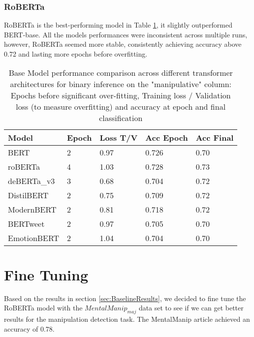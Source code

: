 \documentclass[
	letterpaper, %
	12pt, %
	unnumberedsections, %
	twoside, %
]{LTJournalArticle}
\begin{document}
\subsubsection{RoBERTa}
RoBERTa is the best-performing model in Table \ref{tab:BaseModelPerformance}, it slightly outperformed BERT-base. All the models performances were inconsistent across multiple runs, however, RoBERTa seemed more stable, consistently achieving accuracy above 0.72 and lasting more epochs before overfitting.



\begin{table}[h!]
	\small
	\begin{tabular}{|p{2.2cm}|p{0.9cm}|p{1cm}|p{1cm}|p{1cm}|}
		\hline
		\textbf{Model} & \textbf{Epoch} & \textbf{Loss T/V} & \textbf{Acc Epoch} & \textbf{Acc Final} \\
		\hline
		BERT           & 2              & 0.97              & 0.726              & 0.70               \\
		roBERTa        & 4              & 1.03              & 0.728              & 0.73               \\
		deBERTa\_v3    & 3              & 0.68              & 0.704              & 0.72               \\
		DistilBERT     & 2              & 0.75              & 0.709              & 0.72               \\
		ModernBERT     & 2              & 0.81              & 0.718              & 0.72               \\
		BERTweet       & 2              & 0.97              & 0.705              & 0.70               \\
		EmotionBERT    & 2              & 1.04              & 0.704              & 0.70               \\


		\hline
	\end{tabular}
	\caption{Base Model performance comparison across different transformer architectures for binary inference on the "manipulative" column: Epochs before significant over-fitting, Training loss / Validation loss (to measure  overfitting) and accuracy at epoch and final classification }
	\label{tab:BaseModelPerformance}
\end{table}

\section{Fine Tuning}
Based on the results in section \ref{sec:BaselineResults}, we decided to fine tune the RoBERTa model with the $MentalManip_{maj}$ data set to see if we can get better results for the manipulation detection task. The MentalManip article\cite{MentalManip} achieved an accuracy of 0.78.
\end{document}
